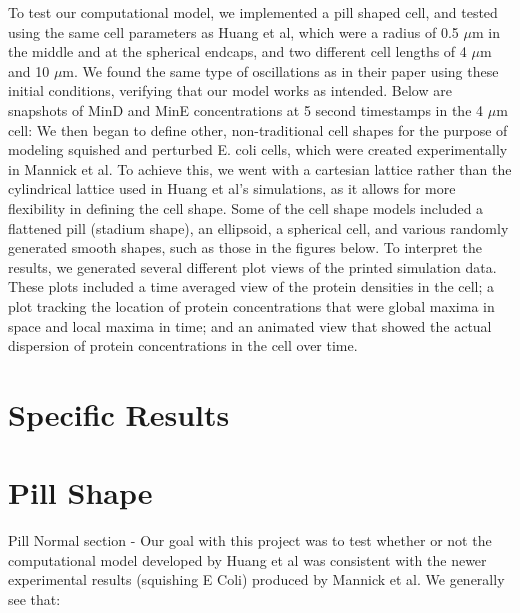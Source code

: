 \documentclass[letterpaper,twocolumn,amsmath,amssymb,pre]{revtex4-1}
\begin{document}
To test our computational model, we implemented a pill shaped cell, and
tested using the same cell parameters as Huang et al, which were a radius
of 0.5 $\mu$m in the middle and at the spherical endcaps, and two different
cell lengths of 4 $\mu$m and 10 $\mu$m. We found the same type of
oscillations as in their paper using these initial conditions, verifying
that our model works as intended. Below are snapshots of MinD and MinE
concentrations at 5 second timestamps in the 4 $\mu$m cell:
\newline
{}
\newline
\newline
We then began to define other, non-traditional cell shapes for the purpose of
modeling squished and perturbed E. coli cells, which were created
experimentally in Mannick et al. To achieve this, we went with a
cartesian lattice rather than the cylindrical lattice used in Huang et 
al's simulations, as it allows for more flexibility in defining the 
cell shape. Some of the cell shape models included a flattened pill
(stadium shape), an ellipsoid, a spherical cell, and various randomly
generated smooth shapes, such as those in the figures below. 
\newline
{}
\newline
\newline
To interpret the results, we generated several different plot views of
the printed simulation data. These plots included a time averaged view
of the protein densities in the cell; a plot tracking the location of
protein concentrations that were global maxima in space and local maxima in 
time; and an animated view that showed the actual dispersion of
protein concentrations in the cell over time. 
\section{Specific Results}
\section{Pill Shape}
Pill Normal section - 
Our goal with this project was to test whether or not the computational model developed by
Huang et al was consistent with the newer experimental results (squishing E
Coli) produced by Mannick et al. We generally see that:
\end{document}
